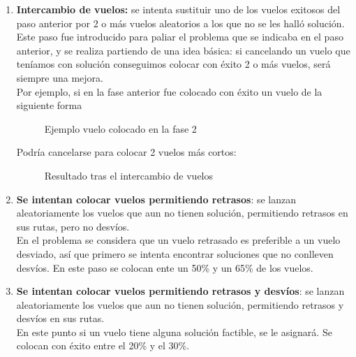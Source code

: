 \begin{enumerate}
	\item \textbf{Intercambio de vuelos: } se intenta sustituir uno de los vuelos exitosos del paso anterior por 2 o más vuelos aleatorios a los que no se les halló solución.\\
	Este paso fue introducido para paliar el problema que se indicaba en el paso anterior, y se realiza partiendo de una idea básica: si cancelando un vuelo que teníamos con solución conseguimos colocar con éxito 2 o más vuelos, será siempre una mejora.\\
	
	Por ejemplo, si en la fase anterior fue colocado con éxito un vuelo de la siguiente forma
	\begin{figure}[H]
		\centering
		
		\caption{Ejemplo vuelo colocado en la fase 2}
		\label{fig: Ejemplo vuelo colocado en la fase 2}
	\end{figure}
	
	Podría cancelarse para colocar 2 vuelos más cortos:
	\begin{figure}[H]
		\centering
		\begin{minipage}[H]{0.4\textwidth}
			
		\end{minipage}
		\hfill
		\begin{minipage}[H]{0.4\textwidth}
			
		\end{minipage}
		\caption{Resultado tras el intercambio de vuelos}
		\label{Fig: Resultado tras el intercambio de vuelos}
	\end{figure}
	
	\item \textbf{Se intentan colocar vuelos permitiendo retrasos}: se lanzan aleatoriamente los vuelos que aun no tienen solución, permitiendo retrasos en sus rutas, pero no desvíos.\\
	En el problema se considera que un vuelo retrasado es preferible a un vuelo desviado, así que primero se intenta encontrar soluciones que no conlleven desvíos. En este paso se colocan ente un 50\% y un 65\% de los vuelos.
	
	\item \textbf{Se intentan colocar vuelos permitiendo retrasos y desvíos}: se lanzan aleatoriamente los vuelos que aun no tienen solución, permitiendo retrasos y desvíos en sus rutas.\\
	En este punto si un vuelo tiene alguna solución factible, se le asignará. Se colocan con éxito entre el 20\% y el 30\%.
	

\end{enumerate}
